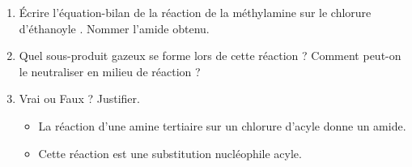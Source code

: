 \documentclass[11pt]{article}
\begin{document}
\begin{exercice}
\begin{enumerate}
    \item Écrire l'équation-bilan de la réaction de la méthylamine  sur le chlorure d'éthanoyle . Nommer l'amide obtenu.
    \item Quel sous-produit gazeux se forme lors de cette réaction ? Comment peut-on le neutraliser en milieu de réaction ?
    \item Vrai ou Faux ? Justifier.
    \begin{itemize}
        \item[a)] La réaction d'une amine tertiaire sur un chlorure d'acyle donne un amide.
        \item[b)] Cette réaction est une substitution nucléophile acyle.
    \end{itemize}
\end{enumerate}
\end{exercice}
\end{document}
